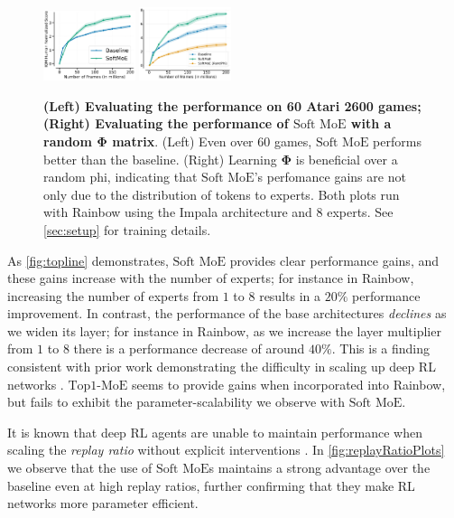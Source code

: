 \documentclass{article}
\theoremstyle{plain}
\theoremstyle{definition}
\theoremstyle{remark}
\newcommand{\moe}{$\textrm{Top1-MoE}$}
\newcommand{\softmoe}{$\textrm{Soft MoE}$}
\begin{document}
\ifarxiv
\else
    \begin{figure}[!t]
        \centering
        \includegraphics[width=0.24\textwidth]{figures/MOES_all_suite_resumenCORRCOLOR.pdf}%
        \includegraphics[width=0.24\textwidth]{figures/randPhi.pdf}%
        \vspace{-0.4cm}
        \caption{\textbf{(Left) Evaluating the performance on 60 Atari 2600 games; (Right) Evaluating the performance of \softmoe{} with a random $\boldsymbol{\Phi}$ matrix}. (Left) Even over 60 games, \softmoe{} performs better than the baseline. (Right) Learning $\boldsymbol{\Phi}$ is beneficial over a random phi, indicating that \softmoe{}'s perfomance gains are not only due to the distribution of tokens to experts. Both plots run with Rainbow using the Impala architecture and 8 experts. See \cref{sec:setup} for training details.}
        \label{fig:allsuite}
    \end{figure}
\fi

As \cref{fig:topline} demonstrates, \softmoe{} provides clear performance gains, and these gains increase with the number of experts; for instance in Rainbow, increasing the number of experts from $1$ to $8$ results in a $20\%$ performance improvement. In contrast, the performance of the base architectures {\em declines} as we widen its layer; for instance in Rainbow, as we increase the layer multiplier from $1$ to $8$ there is a performance decrease of around $40\%$. This is a finding consistent with prior work demonstrating the difficulty in scaling up deep RL networks \citep{farebrother2022proto, taiga2022investigating, schwarzer23bbf}.
\moe{} seems to provide gains when incorporated into Rainbow, but fails to exhibit the parameter-scalability we observe with \softmoe{}.

It is known that deep RL agents are unable to maintain performance when scaling the {\em replay ratio} without explicit interventions \citep{doro2023sampleefficient,schwarzer23bbf}. In \cref{fig:replayRatioPlots} we observe that the use of \softmoe{}s maintains a strong advantage over the baseline even at high replay ratios, further confirming that they make RL networks more parameter efficient.
\end{document}
